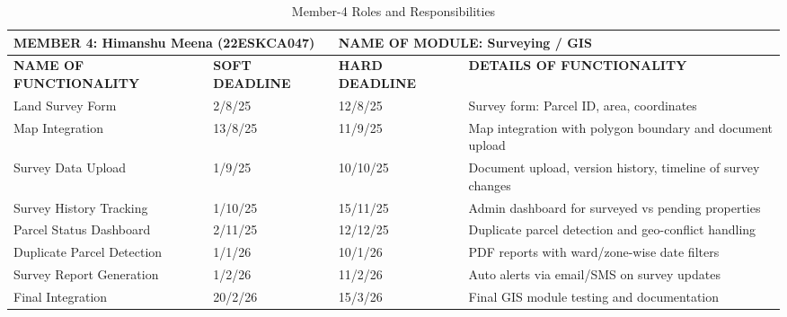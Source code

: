 \begin{table}[H]
\begin{center}
 \begin{tabular}{| m{4cm} | m{2.5cm} | m{2.5cm}| m{5cm}| } 
\hline
\multicolumn{2}{|l|}{MEMBER 4: Himanshu Meena (22ESKCA047)}&
\multicolumn{2}{|l|}{NAME OF MODULE: Surveying / GIS}\\
\hline
\textbf{NAME OF FUNCTIONALITY} & \textbf{SOFT DEADLINE} & \textbf{HARD DEADLINE} & \textbf{DETAILS OF FUNCTIONALITY} \\ 
\hline
Land Survey Form & 2/8/25 & 12/8/25 & Survey form: Parcel ID, area, coordinates \\
\hline
Map Integration & 13/8/25 & 11/9/25 & Map integration with polygon boundary and document upload \\
\hline
Survey Data Upload & 1/9/25 & 10/10/25 & Document upload, version history, timeline of survey changes \\
\hline
Survey History Tracking & 1/10/25 & 15/11/25 & Admin dashboard for surveyed vs pending properties \\
\hline
Parcel Status Dashboard & 2/11/25 & 12/12/25 & Duplicate parcel detection and geo-conflict handling \\
\hline
Duplicate Parcel Detection & 1/1/26 & 10/1/26 & PDF reports with ward/zone-wise date filters \\
\hline
Survey Report Generation & 1/2/26 & 11/2/26 & Auto alerts via email/SMS on survey updates \\
\hline
Final Integration & 20/2/26 & 15/3/26 & Final GIS module testing and documentation \\
\hline
\end{tabular}
\caption{Member-4 Roles and Responsibilities}
\end{center}
\end{table}
